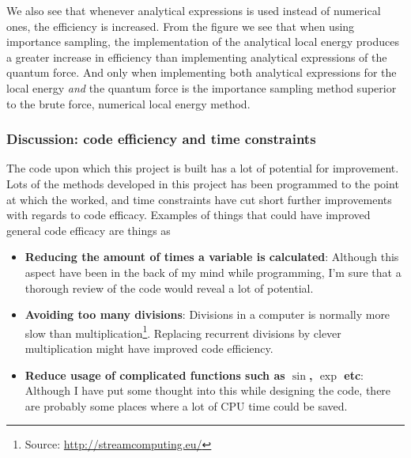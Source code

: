 We also see that whenever analytical expressions is used instead of numerical ones, the efficiency is increased. 
From the figure we see that when using importance sampling, the implementation of the analytical local energy produces a greater increase in efficiency than implementing analytical expressions of the quantum force.
And only when implementing both analytical expressions for the local energy \textit{and} the quantum force is the importance sampling method superior to the brute force, numerical local energy method. 



\clearpage

















\subsubsection{Discussion: code efficiency and time constraints}\label{sec:ce_tc}

The code upon which this project is built has a lot of potential for improvement. 
Lots of the methods developed in this project has been programmed to the point at which the worked, and time constraints have cut short further improvements with regards to code efficacy.
Examples of things that could have improved general code efficacy are things as 

\begin{itemize}
	\item \textbf{Reducing the amount of times a variable is calculated}:
	Although this aspect have been in the back of my mind while programming, I'm sure that a thorough review of the code would reveal a lot of potential. 
	\item \textbf{Avoiding too many divisions}: 
	Divisions in a computer is normally more slow than multiplication\footnote{Source: \href{http://streamcomputing.eu/blog/2012-07-16/how-expensive-is-an-operation-on-a-cpu/}{http://streamcomputing.eu/}}. Replacing recurrent divisions by clever multiplication might have improved code efficiency.
	\item \textbf{Reduce usage of complicated functions such as $\sin$, $\exp$ etc}:
	Although I have put some thought into this while designing the code, there are probably some places where a lot of CPU time could be saved. 
\end{itemize}

